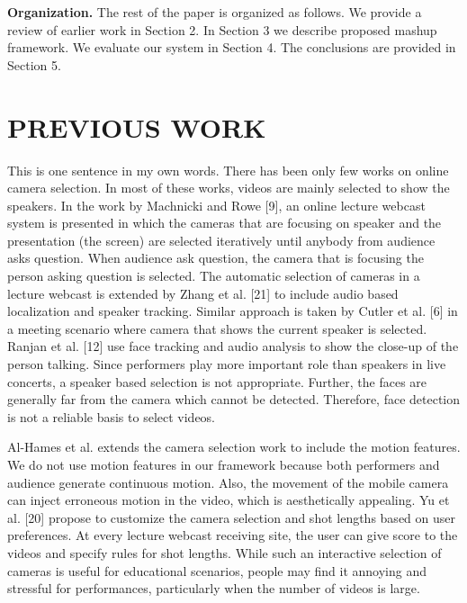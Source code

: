 \documentclass{clsfile}
\begin{document}
\textbf{Organization.} The rest of the paper is organized as follows. We provide a review of earlier work in Section 2. In Section 3 we describe proposed mashup framework. We evaluate our system in Section 4. The conclusions are provided in Section 5.

\section{PREVIOUS WORK}
This is one sentence in my own words.
There has been only few works on online camera selection. In most of these works, videos are mainly selected to show the speakers. In the work by Machnicki and Rowe [9], an online lecture webcast system is presented in which the cameras that are focusing on speaker and the presentation (the screen) are selected iteratively until anybody from audience asks question. When audience ask question, the camera that is focusing the person asking question is selected. The automatic selection of cameras in a lecture webcast is extended by Zhang et al. [21] to include audio based localization and speaker tracking. Similar approach is taken by Cutler et al. [6] in a meeting scenario where camera that shows the current speaker is selected. Ranjan et al. [12] use face tracking and audio analysis to show the close-up of the person talking. Since performers play more important role than speakers in live concerts, a speaker based selection is not appropriate. Further, the faces are generally far from the camera which cannot be detected. Therefore, face detection is not a reliable basis to select videos.

Al-Hames et al. \cite{} extends the camera selection work to include the motion features. We do not use motion features in our framework because both performers and audience generate continuous motion. Also, the movement of the mobile camera can inject erroneous motion in the video, which is aesthetically appealing. Yu et al. [20] propose to customize the camera selection and shot lengths based on user preferences. At every lecture webcast receiving site, the user can give score to the videos and specify rules for shot lengths. While such an interactive selection of cameras is useful for educational scenarios, people may find it annoying and stressful for performances, particularly when the number of videos is large.
\end{document}
